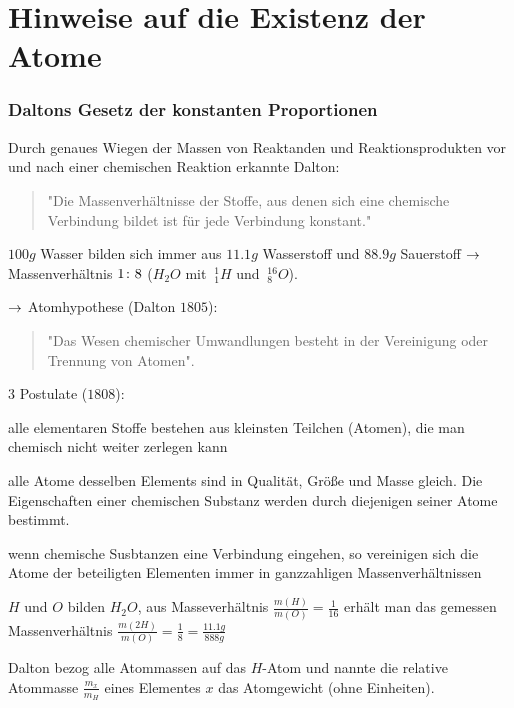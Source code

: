 \section{Hinweise auf die Existenz der Atome} %
\label{sec:Hinweise_auf_die_Existenz_der_Atome}
\subsubsection{Daltons Gesetz der konstanten Proportionen} %
\label{ssub:Daltons_Gesetz_der_konstanten_Proportionen}
Durch genaues Wiegen der Massen von Reaktanden und Reaktionsprodukten vor und
nach einer chemischen Reaktion erkannte Dalton:
\begin{quote}
"Die Massenverhältnisse der Stoffe, aus denen sich eine chemische Verbindung
bildet ist für jede Verbindung konstant."
\end{quote}
\begin{beis}
   $100g$ Wasser bilden sich immer aus $11.1g$ Wasserstoff und $88.9g$
   Sauerstoff $\rightarrow$ Massenverhältnis $1\colon8$ ($H_2 O$ mit $\ _1^1 H$ und $\
   _8^{16} O$). 
\end{beis}
$\rightarrow$ Atomhypothese (Dalton $1805$):
\begin{quote}
"Das Wesen chemischer Umwandlungen besteht in der Vereinigung oder Trennung von
Atomen".
\end{quote}
\begin{erlit}{$3$ Postulate ($1808$):}
    \item alle elementaren Stoffe bestehen aus kleinsten Teilchen (Atomen), die
    man chemisch nicht weiter zerlegen kann
    \item alle Atome desselben Elements sind in Qualität, Größe und Masse
    gleich. Die Eigenschaften einer chemischen Substanz werden durch diejenigen
    seiner Atome bestimmt.
    \item wenn chemische Susbtanzen eine Verbindung eingehen, so vereinigen
    sich die Atome der beteiligten Elementen immer in ganzzahligen
    Massenverhältnissen
\end{erlit}
\begin{beis}
    $H$ und $O$ bilden $H_2 O$, aus Masseverhältnis
    $\frac{m(H)}{m(O)}=\frac{1}{16}$ erhält man das gemessen Massenverhältnis
    $\frac{m(2H)}{m(O)}= \frac{1}{8} = \frac{11.1g}{888g}$
\end{beis}
Dalton bezog alle Atommassen auf das $H$-Atom und nannte die relative Atommasse
$\frac{m_x}{m_H}$ eines Elementes $x$ das Atomgewicht (ohne Einheiten).

